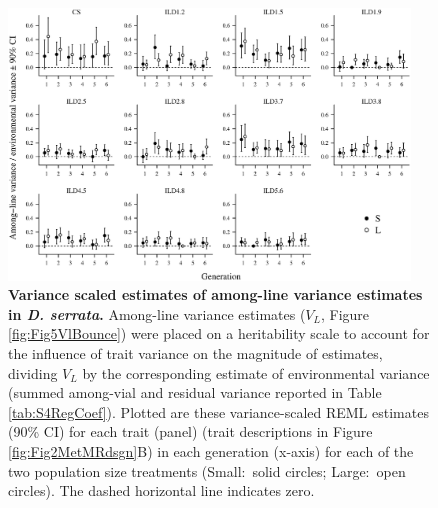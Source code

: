 \begin{figure}
    \centering
    \includegraphics[width=0.95\textwidth]{Supp/Chp2_Meta/S5_VLVe.eps}
    \caption[Variance scaled estimates of among-line variance estimates in \textit{D. serrata}.]{\textbf{Variance scaled estimates of among-line variance estimates in \textit{D. serrata}.} Among-line variance estimates ($V_L$, Figure \ref{fig:Fig5VlBounce}) were placed on a heritability scale to account for the influence of trait variance on the magnitude of estimates, dividing $V_L$ by the corresponding estimate of environmental variance (summed among-vial and residual variance reported in Table \ref{tab:S4RegCoef}). Plotted are these variance-scaled REML estimates (90\% CI) for each trait (panel) (trait descriptions in Figure \ref{fig:Fig2MetMRdsgn}B) in each generation (x-axis) for each of the two population size treatments (Small:~solid circles; Large:~open circles). The dashed horizontal line indicates zero.}
    \label{fig:S5h2m}
\end{figure}

